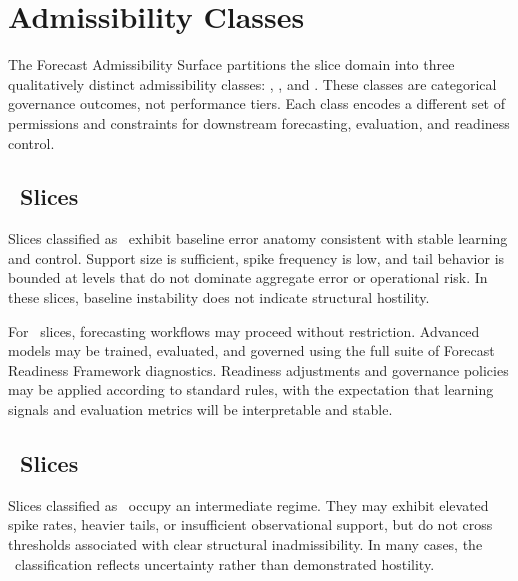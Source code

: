 
\section{Admissibility Classes}
\label{sec:fas_classes}

The Forecast Admissibility Surface partitions the slice domain into three
qualitatively distinct admissibility classes: \Allowed, \Conditional, and
\Blocked. These classes are categorical governance outcomes, not performance
tiers. Each class encodes a different set of permissions and constraints for
downstream forecasting, evaluation, and readiness control.

\subsection{\Allowed\ Slices}
\label{subsec:fas_allowed}

Slices classified as \Allowed\ exhibit baseline error anatomy consistent with
stable learning and control. Support size is sufficient, spike frequency is low,
and tail behavior is bounded at levels that do not dominate aggregate error or
operational risk. In these slices, baseline instability does not indicate
structural hostility.

For \Allowed\ slices, forecasting workflows may proceed without restriction.
Advanced models may be trained, evaluated, and governed using the full suite of
Forecast Readiness Framework diagnostics. Readiness adjustments and governance
policies may be applied according to standard rules, with the expectation that
learning signals and evaluation metrics will be interpretable and stable.

\subsection{\Conditional\ Slices}
\label{subsec:fas_conditional}

Slices classified as \Conditional\ occupy an intermediate regime. They may
exhibit elevated spike rates, heavier tails, or insufficient observational
support, but do not cross thresholds associated with clear structural
inadmissibility. In many cases, the \Conditional\ classification reflects
uncertainty rather than demonstrated hostility.

